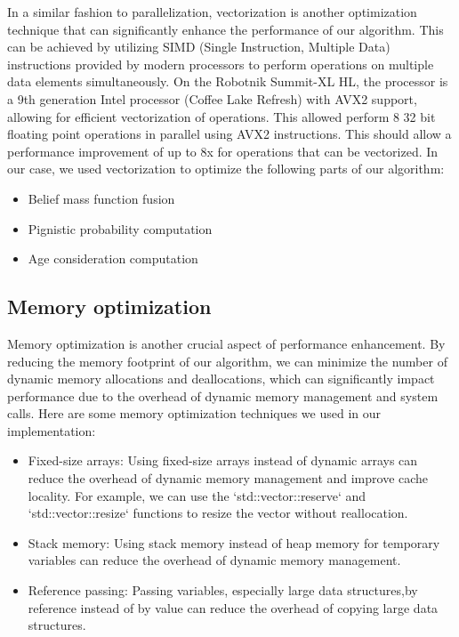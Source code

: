 In a similar fashion to parallelization, vectorization is another optimization technique that can significantly enhance the performance of our algorithm.
This can be achieved by utilizing SIMD (Single Instruction, Multiple Data) instructions provided by modern processors to perform operations on multiple data elements simultaneously.
On the Robotnik Summit-XL HL, the processor is a 9th generation Intel processor (Coffee Lake Refresh) with AVX2 support, allowing for efficient vectorization of operations.
This allowed perform 8 32 bit floating point operations in parallel using AVX2 instructions.
This should allow a performance improvement of up to 8x for operations that can be vectorized.
In our case, we used vectorization to optimize the following parts of our algorithm:
\begin{itemize}
    \item Belief mass function fusion
    \item Pignistic probability computation
    \item Age consideration computation
\end{itemize}

\subsection{Memory optimization}

Memory optimization is another crucial aspect of performance enhancement.
By reducing the memory footprint of our algorithm, we can minimize the number of dynamic memory allocations and deallocations, which can significantly impact performance due to the overhead of dynamic memory management and system calls.
Here are some memory optimization techniques we used in our implementation:

\begin{itemize}
    \item Fixed-size arrays: Using fixed-size arrays instead of dynamic arrays can reduce the overhead of dynamic memory management and improve cache locality.
          For example, we can use the `std::vector::reserve` and  `std::vector::resize` functions to resize the vector without reallocation.
    \item Stack memory: Using stack memory instead of heap memory for temporary variables can reduce the overhead of dynamic memory management.
    \item Reference passing: Passing variables, especially large data structures,by reference instead of by value can reduce the overhead of copying large data structures.
\end{itemize}

